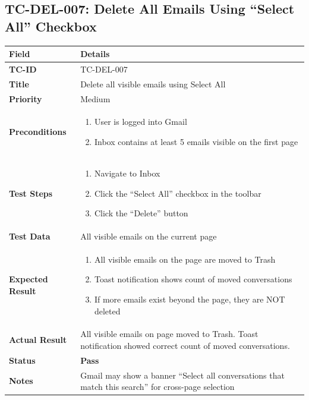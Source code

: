 \documentclass[12pt,a4paper]{article}
\begin{document}
\subsection{TC-DEL-007: Delete All Emails Using ``Select All'' Checkbox}

\begin{longtable}{|L{3.5cm}|L{11.5cm}|}
\hline
{}\textbf{Field} & \textbf{Details} \\
\hline
\textbf{TC-ID}           & TC-DEL-007 \\
\hline
\textbf{Title}           & Delete all visible emails using Select All \\
\hline
\textbf{Priority}        & Medium \\
\hline
\textbf{Preconditions}   & \begin{enumerate}[noitemsep,topsep=0pt]
                              \item User is logged into Gmail
                              \item Inbox contains at least 5 emails visible on the first page
                            \end{enumerate} \\
\hline
\textbf{Test Steps}      & \begin{enumerate}[noitemsep,topsep=0pt]
                              \item Navigate to Inbox
                              \item Click the ``Select All'' checkbox in the toolbar
                              \item Click the ``Delete'' button
                            \end{enumerate} \\
\hline
\textbf{Test Data}       & All visible emails on the current page \\
\hline
\textbf{Expected Result} & \begin{enumerate}[noitemsep,topsep=0pt]
                              \item All visible emails on the page are moved to Trash
                              \item Toast notification shows count of moved conversations
                              \item If more emails exist beyond the page, they are NOT deleted
                            \end{enumerate} \\
\hline
\textbf{Actual Result}   & All visible emails on page moved to Trash. Toast notification showed correct count of moved conversations. \\
\hline
\textbf{Status}          & \textcolor{passgreen}{\textbf{Pass}} \\
\hline
\textbf{Notes}           & Gmail may show a banner ``Select all conversations that match this search'' for cross-page selection \\
\hline
\end{longtable}
\end{document}
